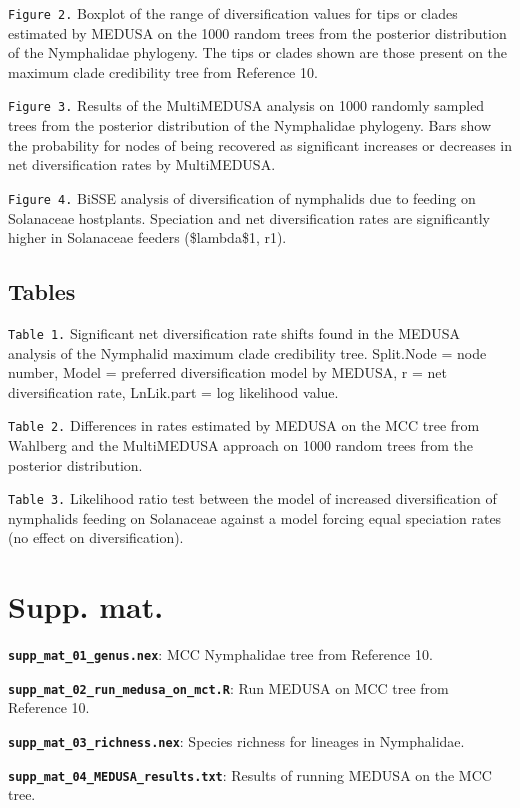\documentclass[]{article}
\begin{document}
\texttt{Figure 2.} Boxplot of the range of diversification values for
tips or clades estimated by MEDUSA on the 1000 random trees from the
posterior distribution of the Nymphalidae phylogeny. The tips or clades
shown are those present on the maximum clade credibility tree from
Reference 10.

\texttt{Figure 3.} Results of the MultiMEDUSA analysis on 1000 randomly
sampled trees from the posterior distribution of the Nymphalidae
phylogeny. Bars show the probability for nodes of being recovered as
significant increases or decreases in net diversification rates by
MultiMEDUSA.

\texttt{Figure 4.} BiSSE analysis of diversification of nymphalids due
to feeding on Solanaceae hostplants. Speciation and net diversification
rates are significantly higher in Solanaceae feeders (\$lambda\$1, r1).

\subsection{Tables}\label{tables}

\texttt{Table 1.} Significant net diversification rate shifts found in
the MEDUSA analysis of the Nymphalid maximum clade credibility tree.
Split.Node = node number, Model = preferred diversification model by
MEDUSA, r = net diversification rate, LnLik.part = log likelihood value.

\texttt{Table 2.} Differences in rates estimated by MEDUSA on the MCC
tree from Wahlberg and the MultiMEDUSA approach on 1000 random trees
from the posterior distribution.

\texttt{Table 3.} Likelihood ratio test between the model of increased
diversification of nymphalids feeding on Solanaceae against a model
forcing equal speciation rates (no effect on diversification).

\section{Supp. mat.}\label{supp.-mat.}

\textbf{\texttt{supp\_mat\_01\_genus.nex}}: MCC Nymphalidae tree from
Reference 10.

\textbf{\texttt{supp\_mat\_02\_run\_medusa\_on\_mct.R}}: Run MEDUSA on
MCC tree from Reference 10.

\textbf{\texttt{supp\_mat\_03\_richness.nex}}: Species richness for
lineages in Nymphalidae.

\textbf{\texttt{supp\_mat\_04\_MEDUSA\_results.txt}}: Results of running
MEDUSA on the MCC tree.
\end{document}
